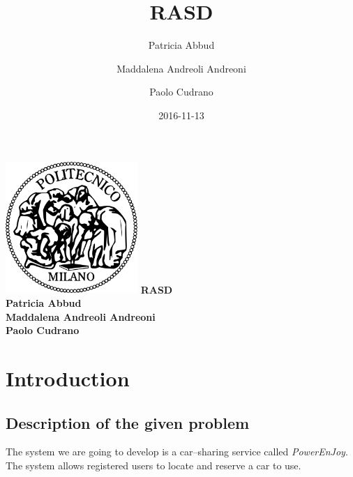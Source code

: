 \documentclass{article}
\title{RASD}
\date{2016-11-13}
\author{
	Patricia Abbud
	\and
	Maddalena Andreoli Andreoni
	\and
	Paolo Cudrano
}
\begin{document}
	\begin{titlepage}
		\centering
		\includegraphics[width=5cm]{img/polimi_logo.png} %
		\vfill
		{\bfseries\Large
			RASD\\
			\vskip4cm
			Patricia Abbud\\
			Maddalena Andreoli Andreoni\\
			Paolo Cudrano\\
		}
		\vfill
		\vfill
	\end{titlepage}

	\tableofcontents
	\newpage

	\section{Introduction}
		\subsection{Description of the given problem}
			The system we are going to develop is a car–sharing service called \textit{PowerEnJoy}. The system allows registered users to locate and reserve a car to use.
\end{document}
